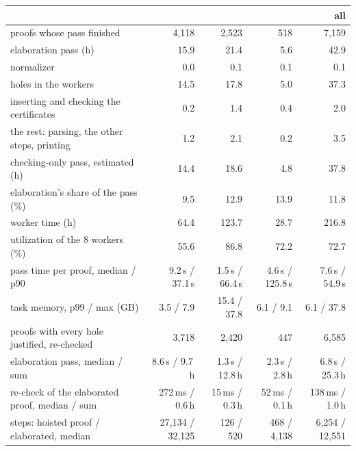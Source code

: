\begin{tabular}{lrrrr}
\toprule
 & \UF{} & \LIA{} & \LRA{} & all \\
\midrule
proofs whose pass finished & 4,118 & 2,523 & 518 & 7,159 \\
elaboration pass (h) & 15.9 & 21.4 & 5.6 & 42.9 \\
\quad normalizer & 0.0 & 0.1 & 0.1 & 0.1 \\
\quad holes in the workers & 14.5 & 17.8 & 5.0 & 37.3 \\
\quad inserting and checking the certificates & 0.2 & 1.4 & 0.4 & 2.0 \\
\quad the rest: parsing, the other steps, printing & 1.2 & 2.1 & 0.2 & 3.5 \\
checking-only pass, estimated (h) & 14.4 & 18.6 & 4.8 & 37.8 \\
\quad elaboration's share of the pass (\%) & 9.5 & 12.9 & 13.9 & 11.8 \\
worker time (h) & 64.4 & 123.7 & 28.7 & 216.8 \\
\quad utilization of the 8 workers (\%) & 55.6 & 86.8 & 72.2 & 72.7 \\
pass time per proof, median / p90 & 9.2\,s / 37.1\,s & 1.5\,s / 66.4\,s & 4.6\,s / 125.8\,s & 7.6\,s / 54.9\,s \\
task memory, p99 / max (GB) & 3.5 / 7.9 & 15.4 / 37.8 & 6.1 / 9.1 & 6.1 / 37.8 \\
\midrule
proofs with every hole justified, re-checked & 3,718 & 2,420 & 447 & 6,585 \\
\quad elaboration pass, median / sum & 8.6\,s / 9.7\,h & 1.3\,s / 12.8\,h & 2.3\,s / 2.8\,h & 6.8\,s / 25.3\,h \\
\quad re-check of the elaborated proof, median / sum & 272\,ms / 0.6\,h & 15\,ms / 0.3\,h & 52\,ms / 0.1\,h & 138\,ms / 1.0\,h \\
\quad steps: hoisted proof / elaborated, median & 27,134 / 32,125 & 126 / 520 & 468 / 4,138 & 6,254 / 12,551 \\
\bottomrule
\end{tabular}
